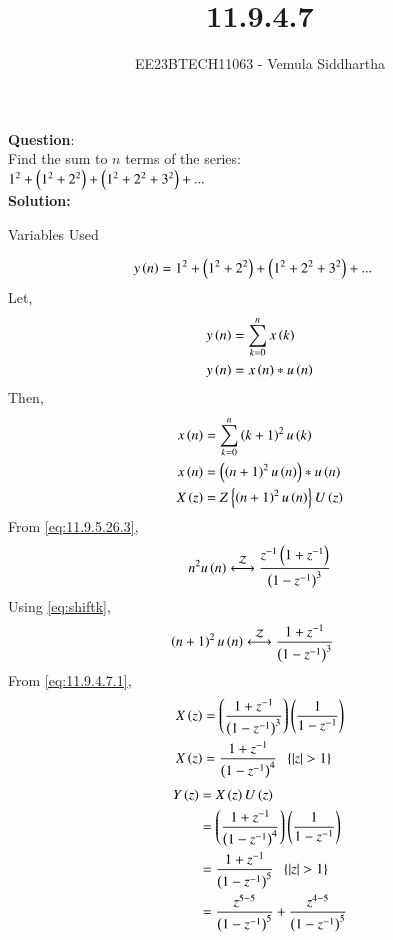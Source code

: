 \documentclass[journal,12pt,twocolumn]{IEEEtran}
\theoremstyle{remark}
\begin{document}

\vspace{3cm}

\title{11.9.4.7}
\author{EE23BTECH11063 - Vemula Siddhartha
}
\maketitle
\newpage
\bigskip

\renewcommand{\thefigure}{\theenumi}
\renewcommand{\thetable}{\theenumi}
\textbf{Question}:\\
Find the sum to $n$ terms of the series:\\
    $1^2+\left(1^2+2^2\right)+\left(1^2+2^2+3^2\right)+...$
    \\
\textbf{Solution:}
\begin{table}[h!]    
    \centering
    
    \caption{Variables Used}
    \label{tab10.5.3.9.1}
  \end{table}
\begin{align}
    y\left(n\right)&=1^2+\left(1^2+2^2\right)+\left(1^2+2^2+3^2\right)+...
\end{align}
Let,
\begin{align}
    y\left(n\right)&=\sum_{k=0}^{n}x\left(k\right)\\
    y\left(n\right)&=x\left(n\right)*u\left(n\right)
\end{align}
Then,
\begin{align}
    x\left(n\right)&=\sum_{k=0}^{n}\left(k+1\right)^2u\left(k\right)\\
    x\left(n\right)&=\left(\left(n+1\right)^2u\left(n\right)\right)*u\left(n\right)\\
    X\left(z\right)&=Z\left\{\left(n+1\right)^2u\left(n\right)\right\}U\left(z\right)
\end{align}
From \eqref{eq:11.9.5.26.3},
\begin{align}
    n^2u\brak{n}\system{Z}\frac{z^{-1}\brak{1+z^{-1}}}{\brak{1-z^{-1}}^3}
\end{align}
Using \eqref{eq:shiftk},
\begin{align}
    \brak{n+1}^2u\brak{n}&\system{Z}\frac{1+z^{-1}}{\brak{1-z^{-1}}^3}\label{eq:11.9.4.7.1}
\end{align}
From \eqref{eq:11.9.4.7.1},
\begin{align}
    X\left(z\right)&=\left(\frac{1+z^{-1}}{\left(1-z^{-1}\right)^3}\right)\left(\frac{1}{1-z^{-1}}\right)\\
    X\left(z\right)&=\frac{1+z^{-1}}{\left(1-z^{-1}\right)^4}\;\;\left\{\left\vert z\right\vert>1\right\}
\end{align}
\begin{align}
    Y\left(z\right)&=X\left(z\right)U\left(z\right)\\
    &=\left(\frac{1+z^{-1}}{\left(1-z^{-1}\right)^4}\right)\left(\frac{1}{1-z^{-1}}\right)\\
    &=\frac{1+z^{-1}}{\left(1-z^{-1}\right)^5}\;\;\left\{\left\vert z\right\vert>1\right\}\\
    &=\frac{z^{5-5}}{\left(1-z^{-1}\right)^5}+\frac{z^{4-5}}{\left(1-z^{-1}\right)^5}
\end{align}
\end{document}
